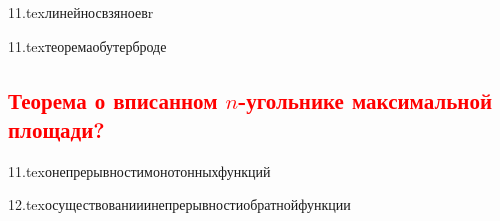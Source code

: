 {11.tex}{линейносвзяноевr}

{11.tex}{теоремаобутерброде}

\subsection{\textcolor{red}{Теорема о вписанном $n$-угольнике максимальной площади?}}

{11.tex}{онепрерывностимонотонныхфункций}


{12.tex}{осуществованииинепрерывностиобратнойфункции}

